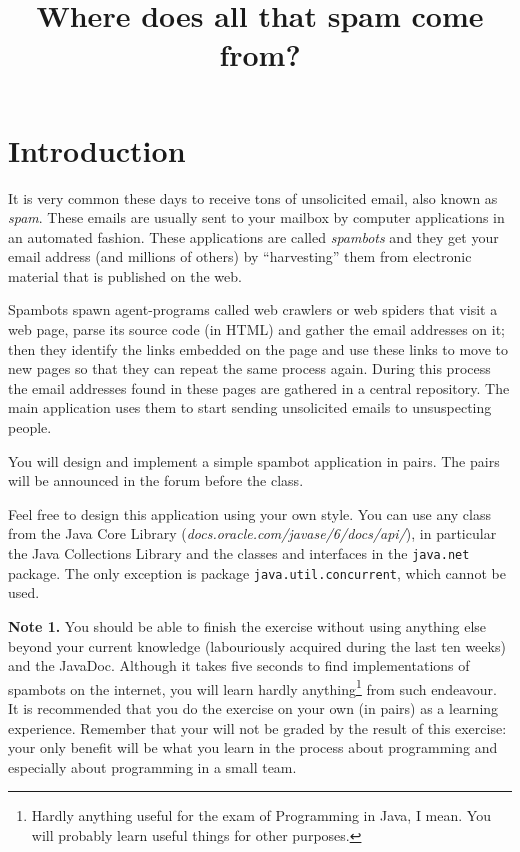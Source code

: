 \documentclass{article}
\begin{document}
\title{Where does all that spam come from?}
\author{}
\date{}

\maketitle

\vspace{1cm}

\section{Introduction}
\label{sec:introduction}

It is very common these days to receive tons of unsolicited email,
also known as \emph{spam}. These emails are usually sent to your
mailbox by computer applications in an automated fashion. These
applications are called \emph{spambots} and they get your email
address (and millions of others) by “harvesting” them from electronic
material that is published on the web. 

Spambots spawn agent-programs called web crawlers or web spiders that
visit a web page, parse its source code (in HTML) and gather the email
addresses on it; then they identify the links embedded on the page and
use these links to move to new pages so that they can repeat the same
process again. During this process the email addresses found in these
pages are gathered in a central repository. The main application uses
them to start sending unsolicited emails to unsuspecting people.

You will design and implement a simple spambot application in pairs. 
The pairs will be announced in the forum before the class. 

Feel free to design this application using your own style. You can use
any class from the Java Core Library
(\emph{docs.oracle.com/javase/6/docs/api/}), in particular the Java
Collections Library and the classes and interfaces in the
\verb+java.net+ package. The only exception is package
\verb+java.util.concurrent+, which cannot be used. 

\vspace{1em}

\textbf{Note 1.} You should be able to finish the exercise without
using anything else beyond your current knowledge (labouriously
acquired during the last ten weeks) and the JavaDoc. Although it takes
five seconds to find implementations of spambots on the internet, you
will learn hardly anything\footnote{Hardly anything useful for the
  exam of Programming in Java, I mean. You will probably learn useful
  things for other purposes.} from such endeavour. It is recommended
that you do the exercise on your own (in pairs) as a learning
experience. Remember that your will not be graded by the result of
this exercise: your only benefit will be what you learn in the process
about programming and especially about programming in a small team. 
\end{document}
